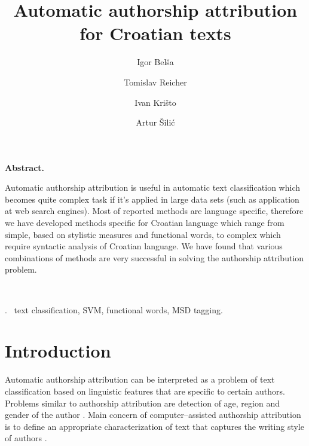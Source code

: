 \documentclass[11pt,english]{article}
\let\LaTeXtitle\title
\renewcommand{\title}[1]{\LaTeXtitle{\Large \textbf{#1}}}
\renewenvironment{abstract}
{\noindent \large \bf Abstract. \normalsize \begin{it}}
{\end{it}\\}
\newenvironment{keywords}
{\noindent {\large {\bf Keywords}}.~}{}
\begin{document}
\title{Automatic authorship attribution for Croatian texts}
\author{Igor Belša}
\author{Tomislav Reicher}
\author{Ivan Krišto}
\author{Artur Šilić}

\date{}

\maketitle

\thispagestyle{empty}
\pagestyle{empty}
\begin{multicols}{2}


\begin{abstract}
Automatic authorship attribution is useful in automatic text classification
which becomes quite complex task if it's applied in large data sets (such as
application at web search engines). Most of reported methods are language
specific, therefore we have developed methods specific for Croatian language
which range from simple, based on stylistic measures and functional words, to
complex which require syntactic analysis of Croatian language. We have found that
various combinations of methods are very successful in solving the authorship
attribution problem.
\end{abstract}

\begin{keywords}
text classification, SVM, functional words, MSD tagging.
\end{keywords}

\section{Introduction}
Automatic authorship attribution can be interpreted as a problem of text
classification based on linguistic features that are specific to certain authors. Problems similar to authorship
attribution are detection of age, region and gender of the author
\citep{luyckx2005shallow}. Main concern of computer--assisted authorship
attribution is to define an appropriate characterization of text that
captures the writing style of authors \citep{coyotl2006authorship}.



\end{multicols}
\end{document}

